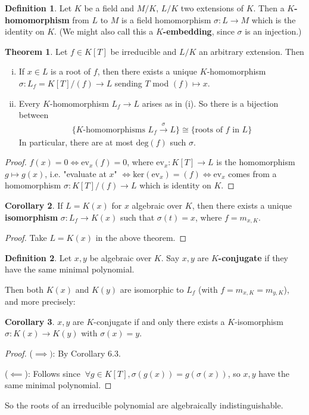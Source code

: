\documentclass{article}
\theoremstyle{definition}
\newtheorem{theorem}{Theorem}[section]
\newtheorem{cor}[theorem]{Corollary}
\newtheorem{defn}{Definition}[section]
\begin{document}
\begin{defn}
    Let $K$ be a field and $M/K$, $L/K$ two extensions of $K$. Then a \textbf{$K$-homomorphism} from $L$ to $M$ is a field homomorphism $\sigma : L \to M$ which is the identity on $K$. (We might also call this a \textbf{$K$-embedding}, since $\sigma$ is an injection.)
\end{defn}
\begin{theorem}\label{6.2}
    Let $f \in K[T]$ be irreducible and $L/K$ an arbitrary extension. Then
    \begin{enumerate}[(i)]
        \item If $x \in L$ is a root of $f$, then there exists a unique $K$-homomorphism $\sigma : L_f = K[T]/(f) \to L$ sending $T$ mod $(f) \mapsto x$.
        \item Every $K$-homomorphism $L_f \to L$ arises as in (i). So there is a bijection between
        \begin{align*}
            \{K\text{-homomorphisms } L_f \stackrel{\sigma}{\to} L\} \cong \{\text{roots of }f \text{ in }L\}
        \end{align*}
        In particular, there are at most $\text{deg}(f)$ such $\sigma$.
    \end{enumerate}
\end{theorem}
\begin{proof}
    $f(x)=0 \iff \text{ev}_x(f)=0$, where $\text{ev}_x : K[T] \to L$ is the homomorphism $g \mapsto g(x)$, i.e. "evaluate at $x$" $\iff \text{ker}(\text{ev}_x) = (f) \iff \text{ev}_x$ comes from a homomorphism $\sigma : K[T]/(f) \to L$ which is identity on $K$.
\end{proof}
\begin{cor}
    If $L = K(x)$ for $x$ algebraic over $K$, then there exists a unique \textbf{isomorphism} $\sigma : L_f \to K(x)$ such that $\sigma(t)=x$, where $f=m_{x,K}$.
\end{cor}
\begin{proof}
    Take $L = K(x)$ in the above theorem.
\end{proof}
\begin{defn}
    Let $x,y$ be algebraic over $K$. Say $x,y$ are \textbf{$K$-conjugate}  if they have the same minimal polynomial.
\end{defn}
Then both $K(x)$ and $K(y)$ are isomorphic to $L_f$ (with $f=m_{x,K}=m_{y,K}$), and more precisely:
\begin{cor}
    $x,y$ are $K$-conjugate if and only there exists a $K$-isomorphism $\sigma : K(x) \to K(y)$ with $\sigma(x)=y$.
\end{cor}
\begin{proof}
    ($\implies)$: By Corollary 6.3.
    \vspace{1mm}
    
    ($\impliedby$): Follows since $~\forall  g \in K[T], \sigma(g(x))=g(\sigma(x))$, so $x,y$ have the same minimal polynomial.
\end{proof}
So the roots of an irreducible polynomial are algebraically indistinguishable.
\vspace{1mm}
\end{document}
